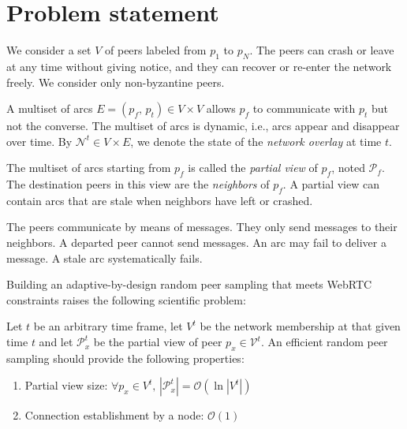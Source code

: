 
\section{Problem statement}
\label{sec:problem}

We consider a set $V$ of peers labeled from $p_1$ to $p_N$.  The peers can
crash or leave at any time without giving notice, and they can recover or
re-enter the network freely. We consider only non-byzantine peers.

A multiset of arcs $E = (p_f,\,p_t) \in V \times V$ allows $p_f$ to
communicate with $p_t$ but not the converse. The multiset of arcs is
dynamic, i.e., arcs appear and disappear over time. By $\mathcal{N}^t
\in V \times E$, we denote the state of the \emph{network overlay} at
time $t$.

The multiset of arcs starting from $p_f$ is called the \emph{partial
  view} of $p_f$, noted $\mathcal{P}_f$. The destination peers in this
view are the \emph{neighbors} of $p_f$. A partial view can contain
arcs that are stale when neighbors have left or crashed.

The peers communicate by means of messages. They only send messages to
their neighbors. A departed peer cannot send messages. An arc may fail
to deliver a message. A stale arc systematically fails.

Building an adaptive-by-design random peer sampling that meets WebRTC
constraints raises the following scientific problem:
\begin{problem}
  Let $t$ be an arbitrary time frame, let $V^t$ be the network membership at
  that given time $t$ and let $\mathcal{P}_x^t$ be the partial view of peer
  $p_x \in \mathcal{V}^t$.  An efficient random peer sampling should provide
  the following properties:
  \begin{enumerate}
  \item Partial view size: \hfill
    $\forall p_x \in V^t,\, |\mathcal{P}_x^t| = \mathcal{O} (\ln
    |V^t|)$      
  \item Connection establishment by a node: \hfill $\mathcal{O}(1)$
  \end{enumerate}
\end{problem}

